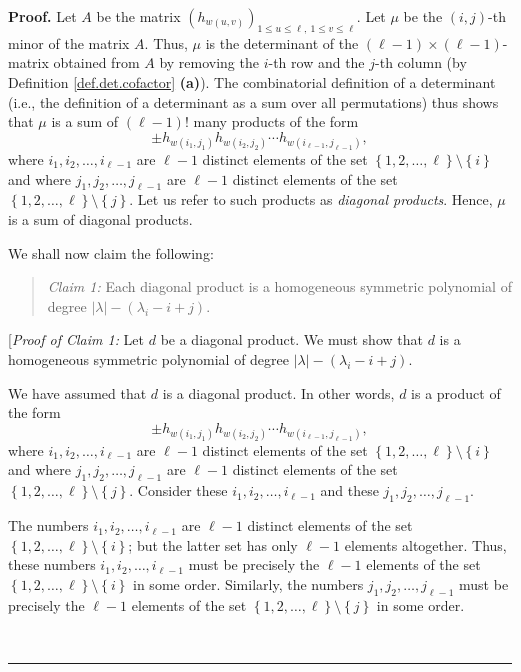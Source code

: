 \documentclass[numbers=enddot,12pt,final,onecolumn,notitlepage]{scrartcl}%
\theoremstyle{definition}
\newenvironment{statement}{\begin{quote}}{\end{quote}}
\newenvironment{proof}[1][Proof]{\noindent\textbf{#1.} }{\ \rule{0.5em}{0.5em}}
\begin{document}
\begin{proof}
Let $A$ be the matrix $\left(  h_{w\left(  u,v\right)  }\right)  _{1\leq
u\leq\ell,\ 1\leq v\leq\ell}$. Let $\mu$ be the $\left(  i,j\right)  $-th
minor of the matrix $A$. Thus, $\mu$ is the determinant of the $\left(
\ell-1\right)  \times\left(  \ell-1\right)  $-matrix obtained from $A$ by
removing the $i$-th row and the $j$-th column (by Definition
\ref{def.det.cofactor} \textbf{(a)}). The combinatorial definition of a
determinant (i.e., the definition of a determinant as a sum over all
permutations) thus shows that $\mu$ is a sum of $\left(  \ell-1\right)  !$
many products of the form%
\[
\pm h_{w\left(  i_{1},j_{1}\right)  }h_{w\left(  i_{2},j_{2}\right)  }\cdots
h_{w\left(  i_{\ell-1},j_{\ell-1}\right)  },
\]
where $i_{1},i_{2},\ldots,i_{\ell-1}$ are $\ell-1$ distinct elements of the
set $\left\{  1,2,\ldots,\ell\right\}  \setminus\left\{  i\right\}  $ and
where $j_{1},j_{2},\ldots,j_{\ell-1}$ are $\ell-1$ distinct elements of the
set $\left\{  1,2,\ldots,\ell\right\}  \setminus\left\{  j\right\}  $. Let us
refer to such products as \textit{diagonal products}. Hence, $\mu$ is a sum of
diagonal products.

We shall now claim the following:

\begin{statement}
\textit{Claim 1:} Each diagonal product is a homogeneous symmetric polynomial
of degree $\left\vert \lambda\right\vert -\left(  \lambda_{i}-i+j\right)  $.
\end{statement}

[\textit{Proof of Claim 1:} Let $d$ be a diagonal product. We must show that
$d$ is a homogeneous symmetric polynomial of degree $\left\vert \lambda
\right\vert -\left(  \lambda_{i}-i+j\right)  $.

We have assumed that $d$ is a diagonal product. In other words, $d$ is a
product of the form
\[
\pm h_{w\left(  i_{1},j_{1}\right)  }h_{w\left(  i_{2},j_{2}\right)  }\cdots
h_{w\left(  i_{\ell-1},j_{\ell-1}\right)  },
\]
where $i_{1},i_{2},\ldots,i_{\ell-1}$ are $\ell-1$ distinct elements of the
set $\left\{  1,2,\ldots,\ell\right\}  \setminus\left\{  i\right\}  $ and
where $j_{1},j_{2},\ldots,j_{\ell-1}$ are $\ell-1$ distinct elements of the
set $\left\{  1,2,\ldots,\ell\right\}  \setminus\left\{  j\right\}  $.
Consider these $i_{1},i_{2},\ldots,i_{\ell-1}$ and these $j_{1},j_{2}%
,\ldots,j_{\ell-1}$.

The numbers $i_{1},i_{2},\ldots,i_{\ell-1}$ are $\ell-1$ distinct elements of
the set $\left\{  1,2,\ldots,\ell\right\}  \setminus\left\{  i\right\}  $; but
the latter set has only $\ell-1$ elements altogether. Thus, these numbers
$i_{1},i_{2},\ldots,i_{\ell-1}$ must be precisely the $\ell-1$ elements of the
set $\left\{  1,2,\ldots,\ell\right\}  \setminus\left\{  i\right\}  $ in some
order. Similarly, the numbers $j_{1},j_{2},\ldots,j_{\ell-1}$ must be
precisely the $\ell-1$ elements of the set $\left\{  1,2,\ldots,\ell\right\}
\setminus\left\{  j\right\}  $ in some order.


\end{proof}
\end{document}
